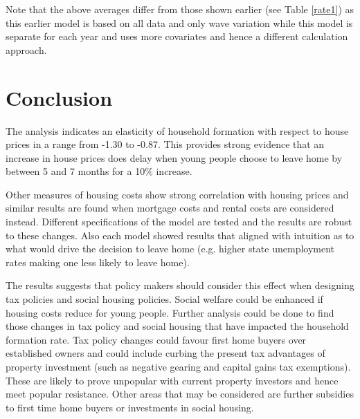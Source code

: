 \documentclass[12pt]{article}
\begin{document}
Note that the above averages differ from those shown earlier (see Table \ref{rate1}) as this earlier model is based on all data and only wave variation while this model is separate for each year and uses more covariates and hence a different calculation approach.

\section{Conclusion}

The analysis indicates an elasticity of household formation with respect to house prices in a range from -1.30 to -0.87. This provides strong evidence that an increase in house prices does delay when young people choose to leave home by between 5 and 7 months for a 10\% increase.

Other measures of housing costs show strong correlation with housing prices and similar results are found when mortgage costs and rental costs are considered instead. Different specifications of the model are tested and the results are robust to these changes. Also each model showed results that aligned with intuition as to what would drive the decision to leave home (e.g. higher state unemployment rates making one less likely to leave home).

The results suggests that policy makers should consider this effect when designing tax policies and social housing policies. Social welfare could be enhanced if housing costs reduce for young people. Further analysis could be done to find those changes in tax policy and social housing that have impacted the household formation rate. Tax policy changes could favour first home buyers over established owners and could include curbing the present tax advantages of property investment (such as negative gearing and capital gains tax exemptions). These are likely to prove unpopular with current property investors and hence meet popular resistance. Other areas that may be considered are further subsidies to first time home buyers or investments in social housing.

\printbibliography{}  %
\end{document}
